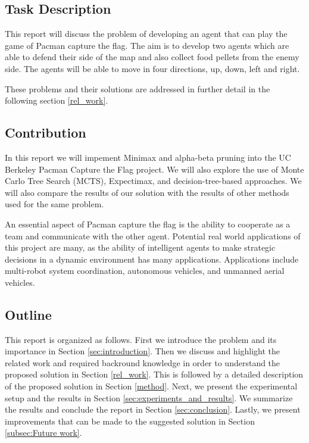 \documentclass[a4paper,12pt]{article}
\begin{document}
\subsection{Task Description}

This report will discuss the problem of developing an agent that can play the game of Pacman capture the flag. 
The aim is to develop two agents which are able to defend their side of the map and also collect food pellets from the enemy side. 
The agents will be able to move in four directions, up, down, left and right.  




These problems and their solutions are addressed in further detail in the following section \ref{rel_work}.




\subsection{Contribution}

In this report we will impement Minimax and alpha-beta pruning into the UC Berkeley Pacman Capture the Flag project. We will also explore the use of Monte Carlo Tree Search (MCTS), Expectimax, and decision-tree-based approaches.
We will also compare the results of our solution with the results of other methods used for the same problem.

An essential aspect of Pacman capture the flag is the ability to cooperate as a team and communicate with the other agent. 
Potential real world applications of this project are many, as the ability of intelligent agents to make strategic decisions in a dynamic environment has many applications. 
Applications include multi-robot system coordination, autonomous vehicles, and unmanned aerial vehicles.







\subsection{Outline}
This report is organized as follows. First we introduce the problem and its importance in Section \ref{sec:introduction}. Then we discuss and highlight the related work and required backround knowledge in order to understand the proposed solution in Section \ref{rel_work}. This is followed by a detailed description of the proposed solution in Section \ref{method}. Next, we present the experimental setup and the results in Section \ref{sec:experiments_and_results}.
We summarize the results and conclude the report in Section \ref{sec:conclusion}. Lastly, we present improvements that can be made to the suggested solution in Section \ref{subsec:Future work}.
\end{document}
